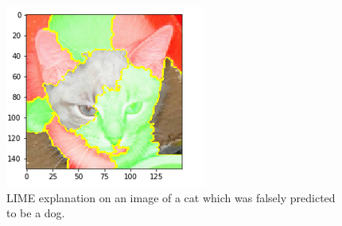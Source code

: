 \begin  {figure}[!htpb]
\centering
  \includegraphics[width=0.8\linewidth]{Evaluation_Images/cats_explain.png}
  \caption{LIME explanation on an image of a cat which was falsely predicted to be a dog.}
  \label{fig:lime-cat-2}
\end{figure}

